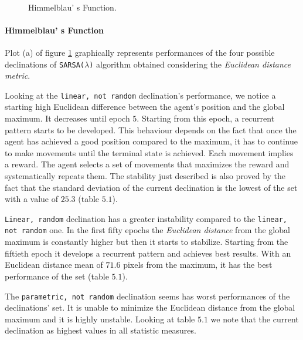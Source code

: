 
\begin{figure}[h!]
	\begin{center}
		\\
	\end{center}
	\caption{
		Himmelblau' s Function.
	}
	\label{fig:HimmelblauResults}
\end{figure}

\paragraph{Himmelblau' s Function} Plot (a) of figure \ref{fig:HimmelblauResults} graphically represents performances of the four possible declinations of {\tt SARSA($\lambda$)} algorithm obtained considering the \textit{Euclidean distance metric}. 

Looking at the {\tt linear, not random} declination's performance, we notice a starting high Euclidean difference between the agent's position and the global maximum. It decreases until epoch $5$. Starting from this epoch, a recurrent pattern starts to be developed. This behaviour depends on the fact that once the agent has achieved a good position compared to the maximum, it has to continue to make movements until the terminal state is achieved. Each movement implies a reward. The agent selects a set of movements that maximizes the reward and systematically repeats them. The stability just described is also proved by the fact that the standard deviation of the current declination is the lowest of the set with a value of $25.3$ (table $5.1$).

{\tt Linear, random} declination has a greater instability compared to the {\tt linear, not random} one. In the first fifty epochs the \textit{Euclidean distance} from the global maximum is constantly higher but then it starts to stabilize. Starting from the fiftieth epoch it develops a recurrent pattern and achieves best results. With an Euclidean distance mean of $71.6$ pixels from the maximum, it has the best performance of the set (table $5.1$).

The {\tt parametric, not random} declination seems has worst performances of the declinations' set. It is unable to minimize the Euclidean distance from the global maximum and it is highly unstable. Looking at table $5.1$ we note that the current declination as highest values in all statistic measures.

